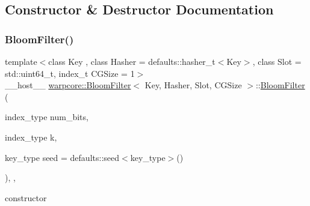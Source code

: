 \subsection{Constructor \& Destructor Documentation}
\mbox{\label{classwarpcore_1_1BloomFilter_a0050427179ed9b718800a42f9eeedb36}} 
\subsubsection{\texorpdfstring{Bloom\+Filter()}{BloomFilter()}\hspace{0.1cm}{\footnotesize\ttfamily [1/3]}}
{\footnotesize\ttfamily template$<$class Key , class Hasher  = defaults\+::hasher\+\_\+t$<$\+Key$>$, class Slot  = std\+::uint64\+\_\+t, index\+\_\+t C\+G\+Size = 1$>$ \\
\+\_\+\+\_\+host\+\_\+\+\_\+ \hyperlink{classwarpcore_1_1BloomFilter}{warpcore\+::\+Bloom\+Filter}$<$ Key, Hasher, Slot, C\+G\+Size $>$\+::\hyperlink{classwarpcore_1_1BloomFilter}{Bloom\+Filter} (\begin{DoxyParamCaption}\item[{index\+\_\+type}]{num\+\_\+bits,  }\item[{index\+\_\+type}]{k,  }\item[{key\+\_\+type}]{seed = {\ttfamily defaults\+:\+:seed$<$key\+\_\+type$>$()} }\end{DoxyParamCaption})\hspace{0.3cm}{\ttfamily [inline]}, {\ttfamily [explicit]}, {\ttfamily [noexcept]}}



constructor 


